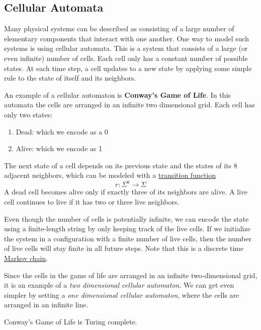   \subsection{Cellular Automata}
  Many physical systems can be described as consisting of a large number of elementary components that interact with one another. One way to model such systems is using cellular automata. This is a system that consists of a large (or even infinite) number of cells. Each cell only has a constant number of possible states. At each time step, a cell updates to a new state by applying some simple rule to the state of itself and its neighbors.

  \begin{definition}
    \label{def:conways-game-of-life}
  An example of a cellular automaton is \textbf{Conway's Game of Life}. In this automata the cells are arranged in an infinite two dimensional grid. Each cell has only two states: 
  \begin{enumerate}
      \item Dead: which we encode as a 0
      \item Alive: which we encode as 1
  \end{enumerate}
  The next state of a cell depends on its previous state and the states of its 8 adjacent neighbors, which can be modeled with a \hyperref[sm-def:transition-function]{transition function}
  \begin{equation}
    r: \Sigma^8 \to \Sigma
  \end{equation}
  A dead cell becomes alive only if exactly three of its neighbors are alive. A live cell continues to live if it has two or three live neighbors. 
  \end{definition}

  Even though the number of cells is potentially infinite, we can encode the state using a finite-length string by only keeping track of the live cells. If we initialize the system in a configuration with a finite number of live cells, then the number of live cells will stay finite in all future steps. Note that this is a discrete time \hyperref[sp-def:markov-chain]{Markov chain}. 

  Since the cells in the game of life are arranged in an infinite two-dimensional grid, it is an example of a \textit{two dimensional cellular automaton}. We can get even simpler by setting a \textit{one dimensional cellular automaton}, where the cells are arranged in an infinite line. 

  \begin{theorem}
    \label{thm:conways-game-of-life-is-turing-complete}
  Conway's Game of Life is Turing complete. 
  \end{theorem}

